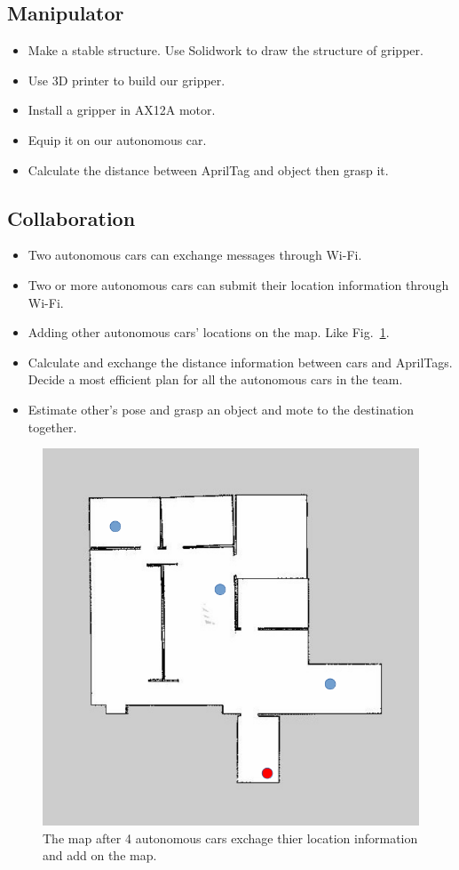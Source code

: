 \documentclass[a4paper, 10pt, conference]{ieeeconf}      %
\begin{document}
\subsection{Manipulator}
\begin{itemize}
	\item Make a stable structure. Use Solidwork to draw the structure of gripper.
	\item Use 3D printer to build our gripper.
	\item Install a gripper in AX12A motor.
	\item Equip it on our autonomous car.
	\item Calculate the distance between AprilTag and object then grasp it.
\end{itemize}



\subsection{Collaboration}
\begin{itemize}
	\item Two autonomous cars can exchange messages through Wi-Fi.
	\item Two or more autonomous cars can submit their location information through Wi-Fi.
	\item Adding other autonomous cars' locations on the map. Like Fig.~\ref{figure:collaboration}.
	\item Calculate and exchange the distance information between cars and AprilTags. Decide a most efficient plan for all the autonomous cars in the team.
	\item Estimate other's pose and grasp an object and mote to the destination together.
\end{itemize}

\begin{figure}[h]
\includegraphics[width=0.95\columnwidth]{collaboration}
\centering
\caption{The map after 4 autonomous cars exchage thier location information and add on the map.}
 \label{figure:collaboration}
\end{figure}
\end{document}
